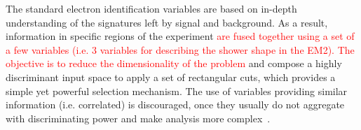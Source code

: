   
The standard electron identification variables are based on in-depth
understanding of the signatures left by signal and background.  As a result, information in specific regions of the experiment
\textcolor{red}{are fused together using a set of a few variables (i.e. 3
variables for describing the shower shape in the EM2). The objective is to reduce the dimensionality of the problem} and compose a highly discriminant input space to apply a set of rectangular cuts, which provides a simple yet powerful selection mechanism. The use of variables providing similar information
(i.e. correlated) is discouraged, once they usually do not aggregate with
discriminating power and make analysis more
complex~\cite{aaboud2019electron}.

